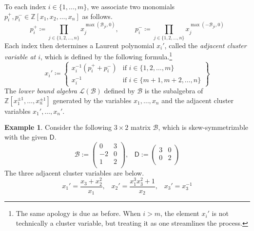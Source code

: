 \documentclass[10pt]{amsart}
\numberwithin{equation}{section}
\theoremstyle{definition}
\newtheorem{ex}[thm]{Example}
\theoremstyle{remark}
\newcommand{\B}{\mathcal{B}}
\renewcommand{\L}{\mathcal{L}}%
\newcommand{\1}{^{-1}}
\def\ZZ{\mathbb{Z}}
\def\Q{\mathsf{Q}}
\newcommand{\gmat}[2][ccccccccccccccccccccccccccccccccc]{\left(\begin{array}{#1} #2\\ \end{array}\right)}
\begin{document}
To each index $i\in \{1,\dots,m\}$, we associate two monomials $p_i^+,p_i^-\in \ZZ[x_1,x_2,\dots,x_n]$ as follows.
\begin{equation}
p_i^+ \coloneqq \prod_{j\in \{1,2,\dots,n\}}x_j^{\max(\B_{ji},0)},\hspace{1cm} p_i^- \coloneqq\prod_{j\in \{1,2,\dots,n\}}x_j^{\max(-\B_{ji},0)}
\end{equation}
Each index then determines a Laurent polynomial $x_i'$, called the \textit{adjacent cluster variable at $i$}, which is defined by the following formula.\footnote{The same apology is due as before. When $i>m$, the element $x_i'$ is not technically a cluster variable, but treating it as one streamlines the process.}
\begin{equation}%
x_i' \coloneqq \left\{\begin{array}{cc}
x_i^{-1}(p_i^++p_i^-) & \text{if $i\in \{1,2,\dots, m\}$} \\
x_i^{-1} & \text{if $i\in \{m+1,m+2,\dots,n\}$}
\end{array}\right\}
\end{equation}
The \textit{lower bound algebra} $\L(\B)$ defined by $\B$ is the subalgebra of $\ZZ[x_1^{\pm1},\dots,x_n^{\pm1}]$ generated by the variables $x_1,\dots,x_n$ and the adjacent cluster variables $x_1',\dots,x_n'$.
\begin{ex}
Consider the following $3\times 2$ matrix $\B$, which is skew-symmetrizable with the given $\mathsf{D}$.
\[ \B := \gmat{0 & 3 \\ -2 & 0 \\ 1 & 2},\;\;\; \mathsf{D}:= \gmat{ 3 & 0 \\ 0 & 2} \]
The three adjacent cluster variables are below.
\[ x_1' = \frac{x_3 + x_2^2}{x_1} ,\;\;\; x_2' = \frac{x_1^3x_3^2+1}{x_2},\;\;\; x_3' = x_3^{-1} \]
\end{ex}


\end{document}

